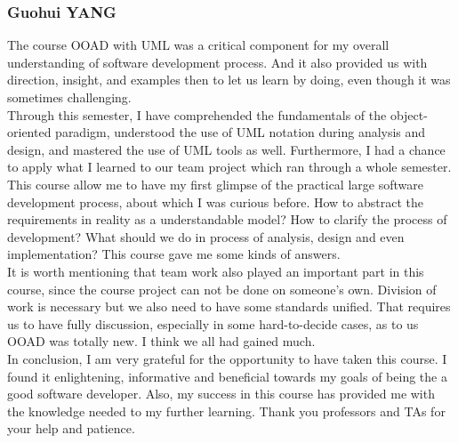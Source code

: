 \documentclass[12pt]{scrreprt}
\begin{document}
\subsubsection{Guohui YANG}
The course OOAD with UML was a critical component for my overall understanding of software development process. And it also provided us with direction, insight, and examples then to let us learn by doing, even though it was sometimes challenging.\\
Through this semester, I have comprehended the fundamentals of the object-oriented paradigm, understood the use of UML notation during analysis and design, and mastered the use of UML tools as well. Furthermore, I had a chance to apply what I learned to our team project which ran through a whole semester. This course allow me to have my first glimpse of the practical large software development process, about which I was curious before. How to abstract the requirements in reality as a understandable model? How to clarify the process of development? What should we do in process of analysis, design and even implementation? This course gave me some kinds of answers.\\
It is worth mentioning that team work also played an important part in this course, since the course project can not be done on someone's own. Division of work is necessary but we also need to have some standards unified. That requires us to have fully discussion, especially in some hard-to-decide cases, as to us OOAD was totally new. I think we all had gained much.\\
In conclusion, I am very grateful for the opportunity to have taken this course. I found it enlightening, informative and beneficial towards my goals of being the a good software developer. Also, my success in this course has provided me with the knowledge needed to my further learning. Thank you professors and TAs for your help and patience.\\
\end{document}

